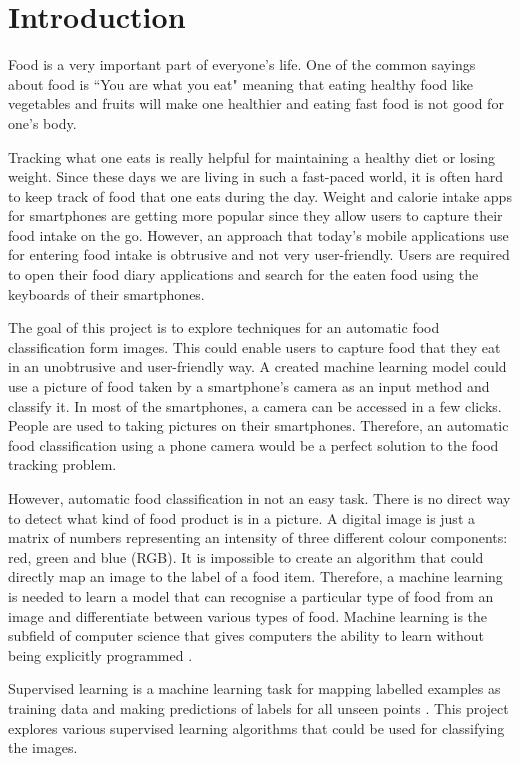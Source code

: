 \chapter{Introduction}

Food is a very important part of everyone’s life.  One of the common sayings about food is ``You are what you eat" meaning that eating healthy food like vegetables and fruits will make one healthier and eating fast food is not good for one's body.  

Tracking what one eats is really helpful for maintaining a healthy diet or losing weight. Since these days we are living in such a fast-paced world, it is often hard to keep track of food that one eats during the day. Weight and calorie intake apps for smartphones are getting more popular since they allow users to capture their food intake on the go. However, an approach that today's mobile applications use for entering food intake is obtrusive and not very user-friendly. Users are required to open their food diary applications and search for the eaten food using the keyboards of their smartphones. 

The goal of this project is to explore techniques for an automatic food classification form images. This could enable users to capture food that they eat in an unobtrusive and user-friendly way. A created machine learning model could use a picture of food taken by a smartphone's camera as an input method and classify it. In most of the smartphones, a camera can be accessed in a few clicks. People are used to taking pictures on their smartphones. Therefore, an automatic food classification using a phone camera would be a perfect solution to the food tracking problem. 

However, automatic food classification in not an easy task. There is no direct way to detect what kind of food product is in a picture. A digital image is just a matrix of numbers representing an intensity of three different colour components: red, green and blue (RGB). It is impossible to create an algorithm that could directly map an image to the label of a food item. Therefore, a machine learning is needed to learn a model that can recognise a particular type of food from an image and differentiate between various types of food. Machine learning is the subfield of computer science that gives computers the ability to learn without being explicitly programmed \citep{Samuel}.

Supervised learning is a machine learning task for mapping labelled examples as training data and making predictions of labels for all unseen points \citep{Mohri:2012:FML:2371238}. This project explores various supervised learning algorithms that could be used for classifying the images.

